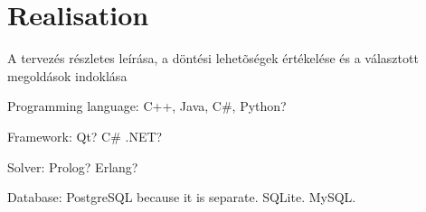 \chapter{Realisation}
A tervezés részletes leírása, a döntési lehetõségek értékelése és a választott megoldások indoklása




Programming language: C++, Java, C#, Python?

Framework: Qt? C# .NET?

Solver: Prolog? Erlang?

Database: PostgreSQL because it is separate. SQLite. MySQL.


